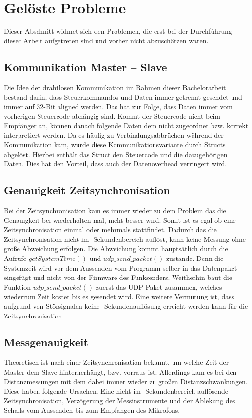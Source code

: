 \newpage
\section{Gelöste Probleme}
Dieser Abschnitt widmet sich den Problemen, die erst bei der Durchführung dieser Arbeit aufgetreten sind und vorher nicht abzuschätzen waren.


\subsection{Kommunikation Master -- Slave}
Die Idee der drahtlosen Kommunikation im Rahmen dieser Bachelorarbeit bestand darin, dass Steuerkommandos und Daten immer getrennt gesendet und immer auf 32-Bit aligned werden. Das hat zur Folge, dass Daten immer vom vorherigen Steuercode abhängig sind. Kommt der Steuercode nicht beim Empfänger an, können danach folgende Daten dem nicht zugeordnet bzw. korrekt interpretiert werden. Da es häufig zu Verbindungsabbrüchen während der Kommunikation kam, wurde diese Kommunikationsvariante durch Structs abgelöst. Hierbei enthält das Struct den Steuercode und die dazugehörigen Daten. Dies hat den Vorteil, dass auch der Datenoverhead verringert wird.

\subsection{Genauigkeit Zeitsynchronisation}
Bei der Zeitsynchronisation kam es immer wieder zu dem Problem das die Genauigkeit bei wiederholten mal, nicht besser wird. Somit ist es egal ob eine Zeitsynchronisation einmal oder mehrmals stattfindet. Dadurch das die Zeitsynchronisation nicht im \si{\mu}-Sekundenbereich auflöst, kann keine Messung ohne große Abweichung erfolgen. Die Abweichung kommt hauptsätlich durch die Aufrufe $getSystemTime()$ und $udp\_send\_packet()$ zustande. Denn die Systemzeit wird vor dem Aussenden vom Programm selber in das Datenpaket eingefügt und nicht von der Firmware des Funksenders. Weitherhin baut die Funktion $udp\_send\_packet()$ zuerst das UDP Paket zusammen, welches wiederrum Zeit kostet bis es gesendet wird. Eine weitere Vermutung ist, dass aufgrund von Störsignalen keine \si{\mu}-Sekundenauflösung erreicht werden kann für die Zeitsynchronisation. 

\subsection{Messgenauigkeit}
Theoretisch ist nach einer Zeitsynchronisation bekannt, um welche Zeit der Master dem Slave hinterherhängt, bzw. vorraus ist. Allerdings kam es bei den Distanzmessungen mit dem \board \platz dabei immer wieder zu großen Distanzschwankungen. Diese haben folgende Ursachen. Eine nicht im \si{\mu}-Sekundenbereich auflösende Zeitsynchronisation, Verzögerung der Messinstrumente und der Ablekung des Schalls vom Aussenden bis zum Empfangen des Mikrofons.

